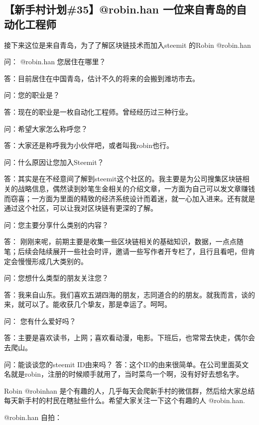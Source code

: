 \documentclass[]{ctexbook}
\begin{document}
\hypertarget{35robin.han-}{%
\subsection{【新手村计划\#35】@robin.han 一位来自青岛的自动化工程师}\label{35robin.han-}}

接下来这位是来自青岛，为了了解区块链技术而加入steemit 的Robin @robin.han

问： @robin.han 您居住在哪里？

答：目前居住在中国青岛，估计不久的将来的会搬到潍坊市去。

问：您的职业是？

答：现在的职业是一枚自动化工程师。曾经经历过三种行业。

问：希望大家怎么称呼您？

答：大家还是称呼我为小伙伴吧，或者叫我robin也行。

问：什么原因让您加入Steemit？

答：其实是在不经意间了解到steemit这个社区的。我主要是为公司搜集区块链相关的战略信息，偶然读到妙笔生金相关的介绍文章，一方面为自己可以发文章赚钱而窃喜；一方面为里面的精致的经济系统设计而着迷，就一心加入进来。还有就是通过这个社区，可以让我对区块链有更深的了解。

问：您主要分享什么类别的内容？

答： 刚刚来呢，前期主要是收集一些区块链相关的基础知识，数据，一点点随笔；后续会陆续展开一些社会时评，邀请一些写作者开专栏了，且行且看吧，但肯定会慢慢形成几大类别的。

问：您想什么类型的朋友关注您？

答：我来自山东。我们喜欢五湖四海的朋友，志同道合的的朋友。就我而言，谈的来，就可以了。能收获几个挚友，那是幸运了。呵呵。

问： 您有什么爱好吗？

答：主要是喜欢读书，上网；喜欢看动漫，电影。下班后，也常常去快走，偶尔会去爬山。

问：能谈谈您的steemit ID由来吗？
答：这个ID的由来很简单。在公司里面英文名就是robin，注册的时候顺手就用了，当时菜鸟一个啊，没有好好去想名字。

Robin @robinhan 是个有趣的人，几乎每天会爬新手村的微信群，然后给大家总结每天新手村的村民在瞎扯些什么。希望大家关注一下这个有趣的人 @robin.han.

@robin.han 自拍：
\end{document}
